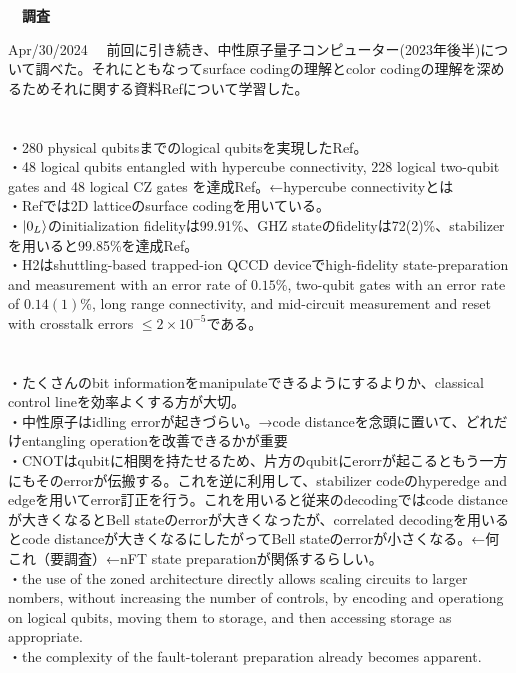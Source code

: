\documentclass[a4paper,10.5pt]{ltjsarticle}
\begin{document}
\centerline
{\huge \bfseries　調査}
\rightline
{Apr/30/2024}
\leftline
{}
　前回に引き続き、中性原子量子コンピューター(2023年後半)について調べた。それにともなってsurface codingの理解とcolor codingの理解を深めるためそれに関する資料Ref\cite{4}\cite{5}について学習した。\\
\\
\\
・280 physical qubitsまでのlogical qubitsを実現したRef\cite{1}。\\
・48 logical qubits entangled with hypercube connectivity, 228 logical two-qubit gates and 48 logical CZ gates を達成Ref\cite{1}。←hypercube connectivityとは\\
・Ref\cite{1}では2D latticeのsurface codingを用いている。\\
・$\ket{0_L}$のinitialization fidelityは99.91\%、GHZ stateのfidelityは72(2)\%、stabilizerを用いると99.85\%を達成Ref\cite{1}。\\
・H2はshuttling-based trapped-ion QCCD deviceでhigh-fidelity state-preparation and measurement with an error rate of $0.15\%$, two-qubit gates with an error rate of $0.14(1)\%$, long range connectivity, and mid-circuit measurement and reset with crosstalk errors $\le 2\times10^{-5}$である。\\
\\
\\
・たくさんのbit informationをmanipulateできるようにするよりか、classical control lineを効率よくする方が大切。\\
・中性原子はidling errorが起きづらい。→code distanceを念頭に置いて、どれだけentangling operationを改善できるかが重要\\
・CNOTはqubitに相関を持たせるため、片方のqubitにerorrが起こるともう一方にもそのerrorが伝搬する。これを逆に利用して、stabilizer codeのhyperedge and edgeを用いてerror訂正を行う。これを用いると従来のdecodingではcode distanceが大きくなるとBell stateのerrorが大きくなったが、correlated decodingを用いるとcode distanceが大きくなるにしたがってBell stateのerrorが小さくなる。←何これ（要調査）←nFT state preparationが関係するらしい。\\
・the use of the zoned architecture directly allows scaling circuits to larger nombers, without increasing the number of controls, by encoding and operationg on logical qubits, moving them to storage, and then accessing storage as appropriate.\\
・the complexity of the fault-tolerant preparation already becomes apparent.\\
\end{document}
